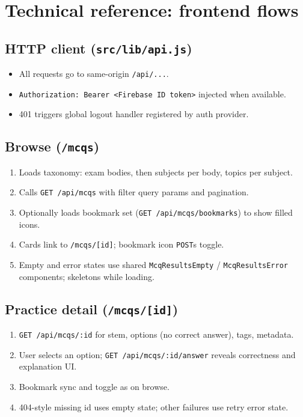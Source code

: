 \documentclass[11pt,a4paper]{article}
\begin{document}
\section{Technical reference: frontend flows}

\subsection{HTTP client (\texttt{src/lib/api.js})}

\begin{itemize}[nosep]
  \item All requests go to same-origin \texttt{/api/...}.
  \item \texttt{Authorization: Bearer <Firebase ID token>} injected when available.
  \item 401 triggers global logout handler registered by auth provider.
\end{itemize}

\subsection{Browse (\texttt{/mcqs})}

\begin{enumerate}[nosep]
  \item Loads taxonomy: exam bodies, then subjects per body, topics per subject.
  \item Calls \texttt{GET /api/mcqs} with filter query params and pagination.
  \item Optionally loads bookmark set (\texttt{GET /api/mcqs/bookmarks}) to show filled icons.
  \item Cards link to \texttt{/mcqs/[id]}; bookmark icon \texttt{POST}s toggle.
  \item Empty and error states use shared \texttt{McqResultsEmpty} / \texttt{McqResultsError} components; skeletons while loading.
\end{enumerate}

\subsection{Practice detail (\texttt{/mcqs/[id]})}

\begin{enumerate}[nosep]
  \item \texttt{GET /api/mcqs/:id} for stem, options (no correct answer), tags, metadata.
  \item User selects an option; \texttt{GET /api/mcqs/:id/answer} reveals correctness and explanation UI.
  \item Bookmark sync and toggle as on browse.
  \item 404-style missing id uses empty state; other failures use retry error state.
\end{enumerate}
\end{document}

